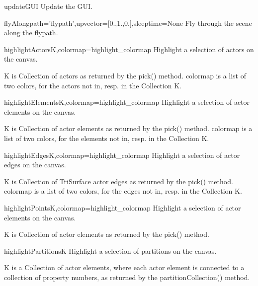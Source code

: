 \begin{funcdesc}{updateGUI}{}
Update the GUI.
\end{funcdesc}

\begin{funcdesc}{flyAlong}{path='flypath',upvector=[0.,1.,0.],sleeptime=None}
Fly through the scene along the flypath.
\end{funcdesc}

\begin{funcdesc}{highlightActors}{K,colormap=highlight_colormap}
Highlight a selection of actors on the canvas.

K is Collection of actors as returned by the pick() method.
colormap is a list of two colors, for the actors not in, resp. in
the Collection K.

\end{funcdesc}

\begin{funcdesc}{highlightElements}{K,colormap=highlight_colormap}
Highlight a selection of actor elements on the canvas.

K is Collection of actor elements as returned by the pick() method.
colormap is a list of two colors, for the elements not in, resp. in
the Collection K.

\end{funcdesc}

\begin{funcdesc}{highlightEdges}{K,colormap=highlight_colormap}
Highlight a selection of actor edges on the canvas.

K is Collection of TriSurface actor edges as returned by the pick() method.
colormap is a list of two colors, for the edges not in, resp. in
the Collection K.

\end{funcdesc}

\begin{funcdesc}{highlightPoints}{K,colormap=highlight_colormap}
Highlight a selection of actor elements on the canvas.

K is Collection of actor elements as returned by the pick() method.


\end{funcdesc}

\begin{funcdesc}{highlightPartitions}{K}
Highlight a selection of partitions on the canvas.

K is a Collection of actor elements, where each actor element is
connected to a collection of property numbers, as returned by the
partitionCollection() method.

\end{funcdesc}

